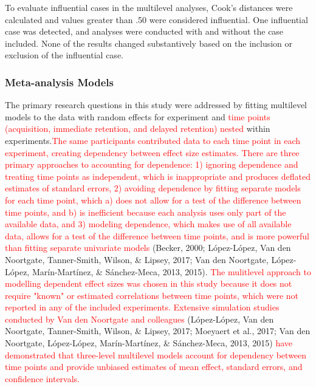 \documentclass[
  english,
  man, donotrepeattitle,mask,floatsintext]{apa7}
\begin{document}
To evaluate influential cases in the multilevel analyses, Cook's distances were calculated and values greater than .50 were considered influential. One influential case was detected, and analyses were conducted with and without the case included. None of the results changed substantively based on the inclusion or exclusion of the influential case.

\hypertarget{meta-analysis-models}{%
\subsubsection{Meta-analysis Models}\label{meta-analysis-models}}

The primary research questions in this study were addressed by fitting multilevel models to the data with random effects for experiment and \textcolor{red}{time points (acquisition, immediate retention, and delayed retention) nested} within experiments.\textcolor{red}{The same participants contributed data to each time point in each experiment, creating dependency between effect size estimates. There are three primary approaches to accounting for dependence: 1) ignoring dependence and treating time points as independent, which is inappropriate and produces deflated estimates of standard errors, 2) avoiding dependence by fitting separate models for each time point, which a) does not allow for a test of the difference between time points, and b) is inefficient because each analysis uses only part of the available data, and 3) modeling dependence, which makes use of all available data, allows for a test of the difference between time points, and is more powerful than fitting separate univariate models} (Becker, 2000; López-López, Van den Noortgate, Tanner-Smith, Wilson, \& Lipsey, 2017; Van den Noortgate, López-López, Marín-Martínez, \& Sánchez-Meca, 2013, 2015). \textcolor{red}{The mulitlevel approach to modelling dependent effect sizes was chosen in this study because it does not require "known" or estimated correlations between time points, which were not reported in any of the included experiments. Extensive simulation studies conducted by Van den Noortgate and colleagues} (López-López, Van den Noortgate, Tanner-Smith, Wilson, \& Lipsey, 2017; Moeyaert et al., 2017; Van den Noortgate, López-López, Marín-Martínez, \& Sánchez-Meca, 2013, 2015) \textcolor{red}{have demonstrated that three-level multilevel models account for dependency between time points and provide unbiased estimates of mean effect, standard errors, and confidence intervals.}
\end{document}
